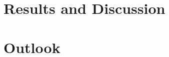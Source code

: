 \documentclass[
  draft=false,
  paper=a4,
  twoside=false,
  fontsize=11pt,
  headsepline,
  BCOR10mm,
  DIV11
]{scrbook}
\begin{document}
    \chapter{Results and Discussion}
      \label{chapter:results_and_discussion}
      


    \chapter{Outlook}
      \label{chapter:outlook}
      
      

  \backmatter
    
    

    \printindex

    \HAWasurency
\end{document}
